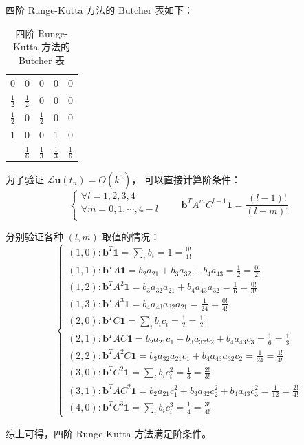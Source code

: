 \documentclass[a4paper]{article}
\begin{document}
\par 四阶 Runge-Kutta 方法的 Butcher 表如下：
\begin{table}[htbp]
    \centering
    \caption{四阶 Runge-Kutta 方法的 Butcher 表}
    \begin{tabular}{c|cccc}
        0 & 0 & 0 & 0 & 0 \\
        $\frac{1}{2}$ & $\frac{1}{2}$ & 0 & 0 & 0 \\
        $\frac{1}{2}$ & 0 & $\frac{1}{2}$ & 0 & 0 \\
        1 & 0 & 0 & 1 & 0 \\
        \hline
         & $\frac{1}{6}$ & $\frac{1}{3}$ & $\frac{1}{3}$ & $\frac{1}{6}$
    \end{tabular}
\end{table}
\par 为了验证 $\mathcal{L}\mathbf{u}(t_n) = O(k^5)$，
可以直接计算阶条件：
\begin{equation}
    \begin{cases}
        \forall l = 1, 2, 3, 4\\
        \forall m = 0, 1, \cdots, 4-l\\
    \end{cases}
    \qquad
    \mathbf{b}^T A^m C^{l-1}\mathbf{1} = \frac{(l-1)!}{(l+m)!}
\end{equation}
\par 分别验证各种 $(l, m)$ 取值的情况：
\begin{equation}
    \begin{cases}
        (1, 0): \mathbf{b}^T \mathbf{1} = \sum_{i} b_i= 1 = \frac{0!}{1!} \\
        (1, 1): \mathbf{b}^T A \mathbf{1} = b_2a_{21}+b_3a_{32}+b_4a_{43} = \frac{1}{2} = \frac{0!}{2!} \\
        (1, 2): \mathbf{b}^T A^2 \mathbf{1} = b_3a_{32}a_{21}+b_4a_{43}a_{32}=\frac{1}{6} = \frac{0!}{3!} \\
        (1, 3): \mathbf{b}^T A^3 \mathbf{1} = b_4a_{43}a_{32}a_{21}=\frac{1}{24} = \frac{0!}{4!} \\
        (2, 0): \mathbf{b}^T C \mathbf{1} = \sum_{i} b_ic_i=\frac{1}{2} = \frac{1!}{2!} \\
        (2, 1): \mathbf{b}^T A C \mathbf{1} = b_2a_{21}c_1+b_3a_{32}c_2+b_4a_{43}c_3=\frac{1}{6} = \frac{1!}{3!}\\
        (2, 2): \mathbf{b}^T A^2 C \mathbf{1} = b_3a_{32}a_{21}c_1+b_4a_{43}a_{32}c_2=\frac{1}{24} = \frac{1!}{4!} \\
        (3, 0): \mathbf{b}^T C^2 \mathbf{1} = \sum_{i} b_ic_i^2=\frac{1}{3}= \frac{2!}{3!}  \\
        (3, 1): \mathbf{b}^T A C^2 \mathbf{1} = b_2a_{21}c_1^2+b_3a_{32}c_2^2+b_4a_{43}c_3^2=\frac{1}{12} =\frac{2!}{4!}\\
        (4, 0): \mathbf{b}^T C^3 \mathbf{1} = \sum_{i} b_ic_i^3=\frac{1}{4}= \frac{3!}{4!} 
    \end{cases}
\end{equation}
\par 综上可得，四阶 Runge-Kutta 方法满足阶条件。
\end{document}
